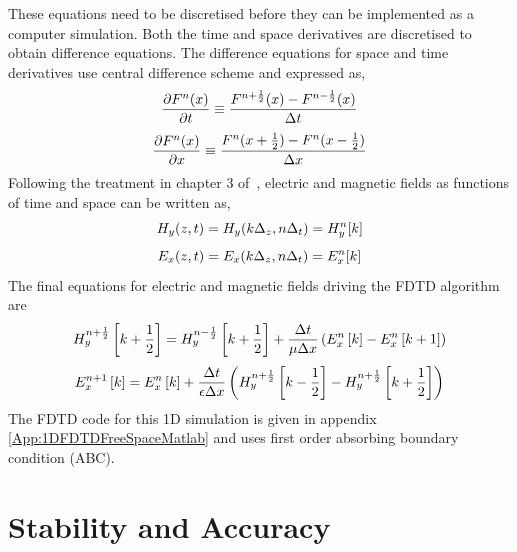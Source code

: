 These equations need to be discretised before they can be implemented as a computer simulation. Both the time and space derivatives are discretised to obtain difference equations. The difference equations for space and time derivatives use central difference scheme and expressed as,
\begin{equation}
\centering
\dfrac{\partial F^n(x)}{\partial t} \equiv \dfrac{F^{n+\frac{1}{2}}(x)-F^{n-\frac{1}{2}}(x)}{\Delta t}
\label{central-difference-time}
\end{equation}
\begin{equation}
\centering
\dfrac{\partial F^n(x)}{\partial x} \equiv \dfrac{F^n(x+\frac{1}{2})-F^n(x-\frac{1}{2})}{\Delta x}
\label{central-difference-space}
\end{equation}
Following the treatment in chapter 3 of~\cite{JBSchneiderUFDTD}, electric and magnetic fields as functions of time and space can be written as,
\begin{equation}
\centering
H_y (z,t)=H_y (k\Delta _z,n\Delta _t)=H^n_y[k]
\label{Hy-of-z_and_t}
\end{equation}
\begin{equation}
\centering
E_x (z,t)=E_x (k\Delta _z,n\Delta _t)=E^n_x[k]
\label{Ex-of-z_and_t}
\end{equation}
The final equations for electric and magnetic fields driving the FDTD algorithm are
\begin{equation}
\centering
H^{n+\frac{1}{2}}_y \left[k+\frac{1}{2}\right]=H^{n-\frac{1}{2}}_y \left[k+\frac{1}{2}\right] + \dfrac{\Delta t}{\mu \Delta x} \left( E^{n}_x \left[k\right] - E^{n}_x \left[k+1\right] \right)
\label{Hy-1D-Simple-FDTD-Driver}
\end{equation}
\begin{equation}
\centering
E^{n+1}_x \left[k\right]=E^{n}_x \left[k\right] + \dfrac{\Delta t}{\epsilon \Delta x} \left( H^{n+\frac{1}{2}}_y \left[k-\frac{1}{2}\right] - H^{n+\frac{1}{2}}_y \left[k+\frac{1}{2}\right] \right)
\label{Ex-1D-Simple-FDTD-Driver}
\end{equation}
The FDTD code for this 1D simulation is given in appendix \ref{App:1DFDTDFreeSpaceMatlab} and uses first order absorbing boundary condition (ABC).
\section{Stability and Accuracy}
